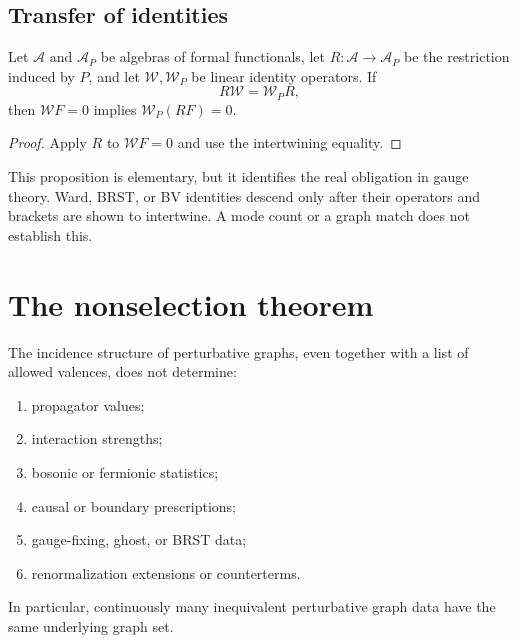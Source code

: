 \documentclass[11pt,a4paper]{article}
\begin{document}
\subsection{Transfer of identities}

\begin{proposition}
\label{prop:ward}
Let \(\mathcal A\) and \(\mathcal A_P\) be algebras of formal functionals,
let \(R:\mathcal A\to\mathcal A_P\) be the restriction induced by \(P\),
and let \(\mathcal W,\mathcal W_P\) be linear identity operators.  If
\[
 R\mathcal W=\mathcal W_P R,
 \]
then \(\mathcal W F=0\) implies \(\mathcal W_P(RF)=0\).
\end{proposition}

\begin{proof}
Apply \(R\) to \(\mathcal W F=0\) and use the intertwining equality.
\end{proof}

This proposition is elementary, but it identifies the real obligation in
gauge theory.  Ward, BRST, or BV identities descend only after their
operators and brackets are shown to intertwine.  A mode count or a graph
match does not establish this.

\section{The nonselection theorem}

\begin{theorem}
\label{thm:nonselection}
The incidence structure of perturbative graphs, even together with a list
of allowed valences, does not determine:
\begin{enumerate}
\item propagator values;
\item interaction strengths;
\item bosonic or fermionic statistics;
\item causal or boundary prescriptions;
\item gauge-fixing, ghost, or BRST data;
\item renormalization extensions or counterterms.
\end{enumerate}
In particular, continuously many inequivalent perturbative graph data have
the same underlying graph set.
\end{theorem}
\end{document}
